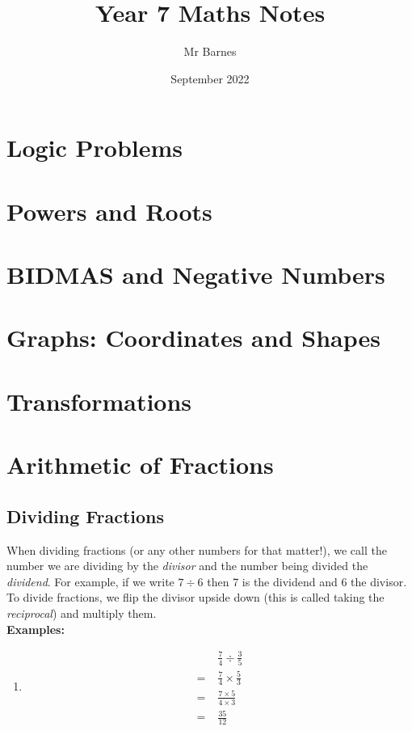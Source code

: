 \documentclass{article}
\title{Year 7 Maths Notes}
\author{Mr Barnes}
\date{September 2022}
\begin{document}
\maketitle

\section{Logic Problems}

\section{Powers and Roots}

\section{BIDMAS and Negative Numbers}

\section{Graphs: Coordinates and Shapes}

\section{Transformations}

\section{Arithmetic of Fractions}

\subsection{Dividing Fractions}

When dividing fractions (or any other numbers for that matter!), we call the number we are dividing by the \textit{divisor} and the number being divided the \textit{dividend}. For example, if we write \(7 \div 6\) then 7 is the dividend and 6 the divisor. To divide fractions, we flip the divisor upside down (this is called taking the \textit{reciprocal}) and multiply them.
\\

\textbf{Examples:}
\\
\begin{enumerate}[start=1,label={E.g.\arabic*}]
    \item \begin{align*}
        &\frac{7}{4} \div \frac{3}{5} \\
        = \;&\frac{7}{4} \times  \frac{5}{3}  \\
        = \;&\frac{7 \times 5}{4 \times 3} \\
        = \; & \frac{35}{12}
    \end{align*}
\end{enumerate}
\end{document}
